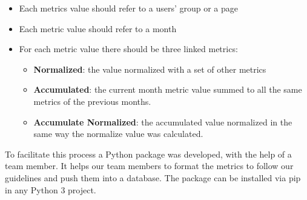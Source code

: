 \begin{itemize}
\item  Each metrics value should refer to a users’ group or a page
\item  Each metric value should refer to a month
\item  For each metric value there should be three linked metrics:
\begin{itemize}
\item  \textbf{Normalized}: the value normalized with a set of other metrics
\item  \textbf{Accumulated}: the current month metric value summed to all the same metrics of the previous months.
\item  \textbf{Accumulate Normalized}: the accumulated value normalized in the same way the normalize value was calculated.
\end{itemize}
\end{itemize}

To facilitate this process a Python package was developed, with the help of a team member. It helps our team members to format the metrics to follow our guidelines and push them into a database. The package can be installed via pip in any Python 3 project.

